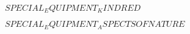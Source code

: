 \raggedcolumns
\begin{multicols}{2}


	\kindredsintro{}
	
	$SPECIAL_EQUIPMENT_KINDRED$


	\columnbreak


	\aspectsofnatureintro{}
		$SPECIAL_EQUIPMENT_ASPECTSOFNATURE$

\end{multicols}

